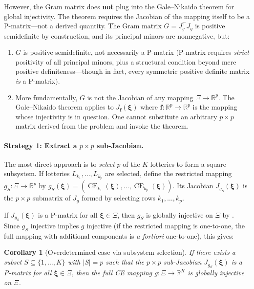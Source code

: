 \documentclass[11pt,a4paper]{article}
\newtheorem{corollary}[theorem]{Corollary}
\theoremstyle{definition}
\newcommand{\R}{\mathbb{R}}
\newcommand{\bxi}{\boldsymbol{\xi}}
\DeclareMathOperator{\CE}{CE}
\begin{document}
However, the Gram matrix does \textbf{not} plug into the Gale--Nikaido
theorem for global injectivity. The theorem requires the Jacobian of the
mapping itself to be a P-matrix---not a derived quantity. The Gram matrix
$G = J_g^\top J_g$ is positive semidefinite by construction, and its
principal minors are nonneg\-ative, but:
\begin{enumerate}
    \item $G$ is positive semidefinite, not necessarily a P-matrix (P-matrix
    requires \emph{strict} positivity of all principal minors, plus a
    structural condition beyond mere positive definiteness---though in fact,
    every symmetric positive definite matrix \emph{is} a P-matrix).

    \item More fundamentally, $G$ is not the Jacobian of any mapping
    $\Xi \to \R^p$. The Gale--Nikaido theorem applies to
    $J_{\mathbf{f}}(\bxi)$ where $\mathbf{f}: \R^p \to \R^p$ is the mapping
    whose injectivity is in question. One cannot substitute an arbitrary
    $p \times p$ matrix derived from the problem and invoke the theorem.
\end{enumerate}

\paragraph{Strategy 1: Extract a $p \times p$ sub-Jacobian.}
The most direct approach is to \emph{select} $p$ of the $K$ lotteries to form
a square subsystem. If lotteries $L_{k_1}, \ldots, L_{k_p}$ are selected,
define the restricted mapping $g_S: \Xi \to \R^p$ by
$g_S(\bxi) = (\CE_{k_1}(\bxi), \ldots, \CE_{k_p}(\bxi))$. Its Jacobian
$J_{g_S}(\bxi)$ is the $p \times p$ submatrix of $J_g$ formed by selecting
rows $k_1, \ldots, k_p$.

If $J_{g_S}(\bxi)$ is a P-matrix for all $\bxi \in \Xi$, then $g_S$ is
globally injective on $\Xi$ by . Since $g_S$ injective
implies $g$ injective (if the restricted mapping is one-to-one, the full
mapping with additional components is \emph{a fortiori} one-to-one), this
gives:

\begin{corollary}[Overdetermined case via subsystem selection]
\label{cor:overdetermined_sub}
If there exists a subset $S \subseteq \{1, \ldots, K\}$ with $|S| = p$ such
that the $p \times p$ sub-Jacobian $J_{g_S}(\bxi)$ is a P-matrix for all
$\bxi \in \Xi$, then the full CE mapping $g: \Xi \to \R^K$ is globally
injective on $\Xi$.
\end{corollary}
\end{document}
